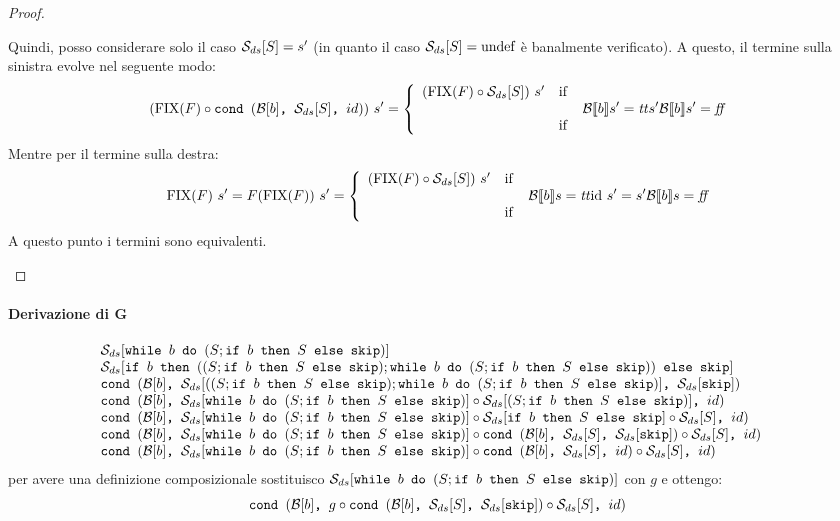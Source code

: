 {\begin{proof}
\begin{itemize}
  Quindi, posso considerare solo il caso $\dsCtxt{S} = s'$ (in quanto il caso
  $\dsCtxt{S} = \undefDS$ è banalmente verificato). A questo, il termine sulla
  sinistra evolve nel seguente modo:
  $$
  (\fixp{F} \circ \cond{b}{\dsCtxt{S}}{id})\ s' =
    \caseFun{(\fixp{F} \circ \dsCtxt{S})\ s'}
            {\B{b}' = \semtrue}
            {s'}
            {\B{b}' = \semfalse}
  $$
  Mentre per il termine sulla destra:
  $$
  \fixp{F}\ s' = F(\fixp{F})\ s' =
    \caseFun{(\fixp{F} \circ \dsCtxt{S})\ s'}
            {\B{b} = \semtrue}
            {\idDS\ s' = s'}
            {\B{b} = \semfalse}
  $$
  A questo punto i termini sono equivalenti.
\end{itemize}

\end{proof}

\paragraph{Derivazione di G}
$$
\begin{array}{ll}
\dsCtxt{\wbS{b}{(S; \ifABC{b}{S}{\skipForFriends})}} & \\
\dsCtxt{\ifABC{b}{((S;  \ifABC{b}{S}{\skipForFriends}); \wbS{b}{(S; \ifABC{b}{S}{\skipForFriends})} )}{\skipForFriends}} & \\
\cond{b}{\dsCtxt{((S;  \ifABC{b}{S}{\skipForFriends}); \wbS{b}{(S; \ifABC{b}{S}{\skipForFriends})}}}{\dsCtxt{\skipForFriends}} \\
\cond{b}{\dsCtxt{\wbS{b}{(S; \ifABC{b}{S}{\skipForFriends})}} \circ \dsCtxt{(S;  \ifABC{b}{S}{\skipForFriends})}}{id} & \\
\cond{b}{\dsCtxt{\wbS{b}{(S; \ifABC{b}{S}{\skipForFriends})}} \circ \dsCtxt{\ifABC{b}{S}{\skipForFriends}} \circ \dsCtxt{S} }{id} & \\
\cond{b}{\dsCtxt{\wbS{b}{(S; \ifABC{b}{S}{\skipForFriends})}} \circ \cond{b}{\dsCtxt{S}}{\dsCtxt{\skipForFriends}} \circ \dsCtxt{S} }{id} & \\
\cond{b}{\dsCtxt{\wbS{b}{(S; \ifABC{b}{S}{\skipForFriends})}} \circ \cond{b}{\dsCtxt{S}}{id} \circ \dsCtxt{S} }{id} & \\
\end{array}
$$
per avere una definizione composizionale sostituisco $\dsCtxt{\wbS{b}{(S; \ifABC{b}{S}{\skipForFriends})}} $ con $g$ e ottengo:
$$
\cond{b}{g \circ \cond{b}{\dsCtxt{S}}{\dsCtxt{\skipForFriends}} \circ \dsCtxt{S} }{id}
$$
}